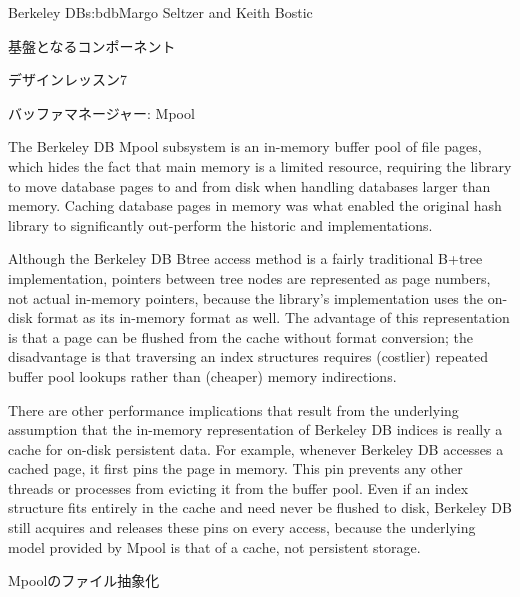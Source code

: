 \begin{aosachapter}{Berkeley DB}{s:bdb}{Margo Seltzer and Keith Bostic}
\begin{aosasect1}{基盤となるコンポーネント}
\begin{aosabox}{デザインレッスン7}
\end{aosabox}

\end{aosasect1}

\begin{aosasect1}{バッファマネージャー: Mpool}

The Berkeley DB Mpool subsystem is an in-memory buffer pool of file
pages, which hides the fact that main memory is a limited resource,
requiring the library to move database pages to and from disk when
handling databases larger than memory. Caching database pages in
memory was what enabled the original hash library to significantly
out-perform the historic  and 
implementations.

Although the Berkeley DB Btree access method is a fairly traditional
B+tree implementation, pointers between tree nodes are represented as
page numbers, not actual in-memory pointers, because the library's
implementation uses the on-disk format as its in-memory format
as well. The advantage of this representation is that a page can be
flushed from the cache without format conversion; the disadvantage is
that traversing an index structures requires (costlier) repeated
buffer pool lookups rather than (cheaper) memory indirections.

There are other performance implications that result from the
underlying assumption that the in-memory representation of Berkeley DB
indices is really a cache for on-disk persistent data. For example,
whenever Berkeley DB accesses a cached page, it first pins the page in
memory. This pin prevents any other threads or processes from 
evicting it from the buffer pool. Even if an index
structure fits entirely in the cache and need never be flushed to
disk, Berkeley DB still acquires and releases these pins on every
access, because the underlying model provided by Mpool is that of a
cache, not persistent storage.

\begin{aosasect2}{Mpoolのファイル抽象化}


\end{aosasect2}
\end{aosasect1}
\end{aosachapter}
